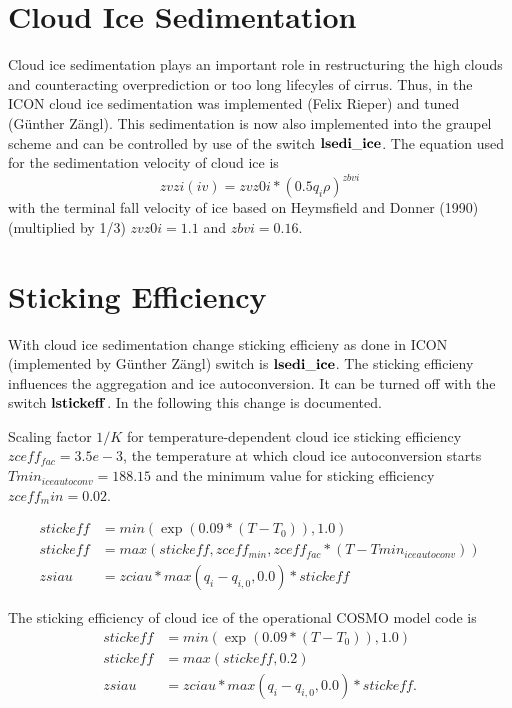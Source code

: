 \documentclass[a4paper,11pt]{article}
\begin{document}
\section{Cloud Ice Sedimentation}
Cloud ice sedimentation plays an important role in restructuring the high
clouds and counteracting overprediction or too long lifecyles of cirrus. Thus,
in the ICON cloud ice sedimentation was implemented (Felix Rieper) and tuned
(G\"unther Z\"angl). This sedimentation is now also implemented into the
graupel scheme and can be controlled by use of the switch
$\bold{lsedi\_ice}$. The equation used for the sedimentation velocity of cloud
ice is 
\begin{equation}
 zvzi(iv) = zvz0i * (0.5 q_i \rho)^{zbvi}
\end{equation}
 with the terminal fall velocity of ice based on Heymsfield and Donner (1990)
(multiplied by 1/3) $zvz0i  = 1.1$ and $zbvi   = 0.16$.

\section{Sticking Efficiency}
With cloud ice sedimentation change sticking efficieny as done in ICON
(implemented by Günther Z\"angl) switch is $\bold{lsedi\_ice}$. The sticking efficieny
influences the aggregation and ice autoconversion. It can be turned off with
the switch $\bold{lstickeff}$. In the following this change is documented.

Scaling factor $1/K$ for temperature-dependent cloud ice sticking efficiency
$zceff_{fac} = 3.5e-3$, the temperature at which cloud ice autoconversion starts
$Tmin_{iceautoconv} = 188.15$ and the minimum value for sticking efficiency
$zceff_min        = 0.02$.

\begin{align}
  stickeff &= min(\exp(0.09*(T-T_0)),1.0) \\
  stickeff &= max(stickeff, zceff_{min}, zceff_{fac}*(T-Tmin_{iceautoconv})) \\
  zsiau &= zciau * max( q_i - q_{i,0}, 0.0 ) * stickeff
\end{align} 

The sticking efficiency of cloud ice of the operational COSMO model code is
\begin{align}
  stickeff &= min(\exp(0.09*(T-T_0)),1.0) \\
  stickeff &= max(stickeff,0.2)\\
  zsiau &= zciau * max( q_i - q_{i,0}, 0.0) *stickeff.
\end{align}
\end{document}
